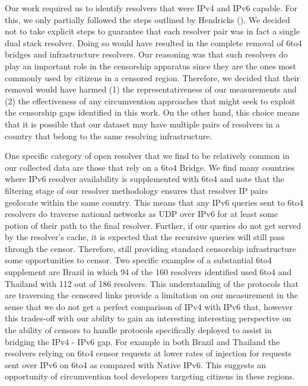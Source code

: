 Our work required us to identify resolvers that were IPv4 and IPv6 capable. For
this, we only partially followed the steps outlined by Hendricks \etal
(\cf {}). We decided not to take explicit steps
to guarantee that each resolver pair was in fact a single dual stack resolver.
Doing so would have resulted in the complete removal of 6to4 bridges and
infrastructure resolvers. Our reasoning was that such resolvers do play an
important role in the censorship apparatus since they are the ones most
commonly used by citizens in a censored region. Therefore, we decided that
their removal would have harmed (1) the representativeness of our measurements
and (2) the effectiveness of any circumvention approaches that might seek to
exploit the censorship gaps identified in this work. On the other hand, this
choice means that it is possible that our dataset may have multiple pairs of
resolvers in a country that belong to the same resolving infrastructure. 

One specific category of open resolver that we find to be relatively common in
our collected data are those that rely on a {6to4 Bridge}. We find many
countries where IPv6 resolver availability is supplemented with 6to4 and note
that the filtering stage of our resolver methodology ensures that resolver IP
pairs geolocate within the same country. This means that any IPv6 queries sent
to 6to4 resolvers do traverse national networks as UDP over IPv6 for at least
some potion of their path to the final resolver. Further, if our queries do not
get served by the resolver's cache, it is expected that the recursive queries
will still pass through the censor. Therefore, still providing standard
censorship infrastructure some opportunities to censor.
%
Two specific examples of a substantial 6to4 supplement are Brazil in which 94
of the 160 resolvers identified used 6to4 and Thailand with 112 out of 186
resolvers. This understanding of the protocols that are traversing the censored
links provide a limitation on our measurement in the sense that we do not get
a perfect comparison of IPv4 with IPv6 that, however this trades-off with our
ability to gain an interesting interesting perspective on the ability of
censors to handle protocols specifically deployed to assist in bridging the
IPv4 - IPv6 gap. For example in both Brazil and Thailand the resolvers relying
on 6to4 censor requests at lower rates of injection for requests sent over IPv6
on 6to4 as compared with Native IPv6. This suggests an opportunity of
circumvention tool developers targeting citizens in these regions.

